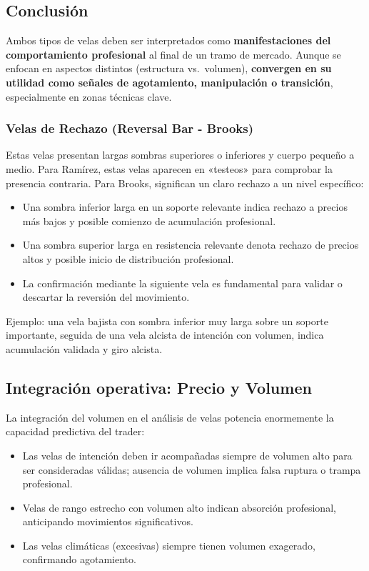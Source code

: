 \subsection*{Conclusi\'on}

Ambos tipos de velas deben ser interpretados como \textbf{manifestaciones del comportamiento profesional} al final de un tramo de mercado. Aunque se enfocan en aspectos distintos (estructura vs.\ volumen), \textbf{convergen en su utilidad como se\~nales de agotamiento, manipulaci\'on o transici\'on}, especialmente en zonas t\'ecnicas clave.


\subsubsection{Velas de Rechazo (Reversal Bar - Brooks)}

Estas velas presentan largas sombras superiores o inferiores y cuerpo peque\~no a medio. Para Ram\'irez, estas velas aparecen en «testeos» para comprobar la presencia contraria. Para Brooks, significan un claro rechazo a un nivel espec\'ifico:

\begin{itemize}
    \item Una sombra inferior larga en un soporte relevante indica rechazo a precios m\'as bajos y posible comienzo de acumulaci\'on profesional.
    \item Una sombra superior larga en resistencia relevante denota rechazo de precios altos y posible inicio de distribuci\'on profesional.
    \item La confirmaci\'on mediante la siguiente vela es fundamental para validar o descartar la reversi\'on del movimiento.
\end{itemize}

Ejemplo: una vela bajista con sombra inferior muy larga sobre un soporte importante, seguida de una vela alcista de intenci\'on con volumen, indica acumulaci\'on validada y giro alcista.

\subsection{Integraci\'on operativa: Precio y Volumen}

La integraci\'on del volumen en el an\'alisis de velas potencia enormemente la capacidad predictiva del trader:

\begin{itemize}
    \item Las velas de intenci\'on deben ir acompa\~nadas siempre de volumen alto para ser consideradas v\'alidas; ausencia de volumen implica falsa ruptura o trampa profesional.
    \item Velas de rango estrecho con volumen alto indican absorci\'on profesional, anticipando movimientos significativos.
    \item Las velas clim\'aticas (excesivas) siempre tienen volumen exagerado, confirmando agotamiento.
\end{itemize}

